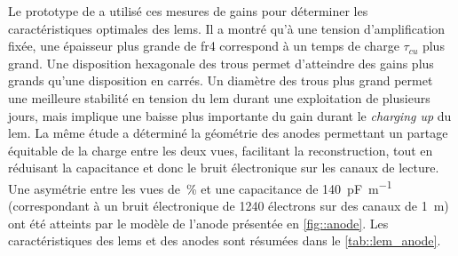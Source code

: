       Le prototype de \threeL{} a utilisé ces mesures de gains pour déterminer les caractéristiques optimales des \glspl{lem}. Il a montré qu'à une tension d'amplification fixée, une épaisseur plus grande de \gls{fr4} correspond à un temps de charge $\tau_{cu}$ plus grand. Une disposition hexagonale des trous permet d'atteindre des gains plus grands qu'une disposition en carrés. Un diamètre des trous plus grand permet une meilleure stabilité en tension du \gls{lem} durant une exploitation de plusieurs jours, mais implique une baisse plus importante du gain durant le \textit{charging up} du \gls{lem}. La même étude a déterminé la géométrie des anodes permettant un partage équitable de la charge entre les deux vues, facilitant la reconstruction, tout en réduisant la capacitance et donc le bruit électronique sur les canaux de lecture. Une asymétrie entre les vues de \,\% et une capacitance de \SI{140}{\pico\farad\per\meter} (correspondant à un bruit électronique de 1240 électrons sur des canaux de \SI{1}{\meter}) ont été atteints par le modèle de l'anode présentée en \autoref{fig::anode}. Les caractéristiques des \glspl{lem} et des anodes sont résumées dans le \autoref{tab::lem_anode}.


